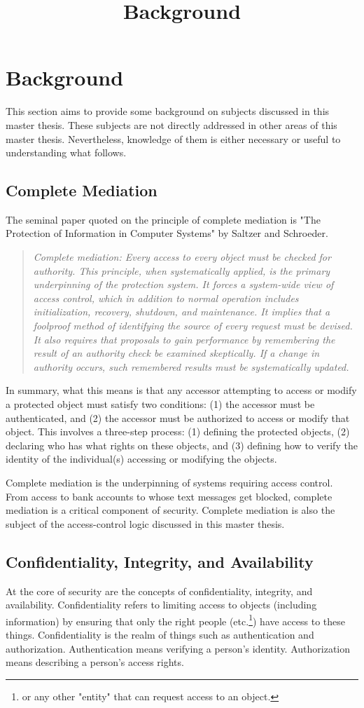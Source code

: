 \documentclass[../../main/main.tex]{subfiles}
\begin{document}
\title{Background}

\chapter{Background}
This section aims to provide some background on subjects discussed in this master thesis.  These subjects are not directly addressed in other areas of this master thesis.  Nevertheless, knowledge of them is either necessary or useful to understanding what follows.

\section{Complete Mediation}
The seminal paper quoted on the principle of complete mediation is "The Protection of Information in Computer Systems" by Saltzer and Schroeder.  
\begin{quote}
\textit{
Complete mediation: Every access to every object must be checked for authority. This principle, when systematically applied, is the primary underpinning of the protection system. It forces a system-wide view of access control, which in addition to normal operation includes initialization, recovery, shutdown, and maintenance. It implies that a foolproof method of identifying the source of every request must be devised. It also requires that proposals to gain performance by remembering the result of an authority check be examined skeptically. If a change in authority occurs, such remembered results must be systematically updated.} \cite{saltzer}
\end{quote}

In summary, what this means is that any accessor attempting to access or modify a protected object must satisfy two conditions: (1) the accessor must be authenticated, and (2) the accessor must be authorized to access or modify that object.  This involves a three-step process: (1) defining the protected objects, (2) declaring who has what rights on these objects, and (3) defining how to verify the identity of the individual(s) accessing or modifying the objects.  


Complete mediation is the underpinning of systems requiring access control.  From access to bank accounts to whose text messages get blocked, complete mediation is a critical component of security.  Complete mediation is also the subject of the access-control logic discussed in this master thesis. 

\section{Confidentiality, Integrity, and Availability}
At the core of security are the concepts of confidentiality, integrity, and availability.  Confidentiality refers to limiting access to objects (including information) by ensuring that only the right people (etc.\footnote{or any other "entity" that can request access to an object.}) have access to these things.  Confidentiality is the realm of things such as authentication and authorization.  Authentication means verifying a person's identity.  Authorization means describing a person's access rights. 
\end{document}

